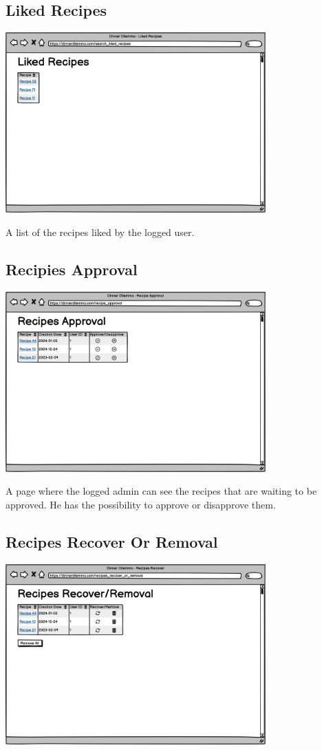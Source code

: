 \subsection{Liked Recipes}
\includegraphics[width=0.75\textwidth]{images/likedrecipes.png}

A list of the recipes liked by the logged user.

\subsection{Recipies Approval}
\includegraphics[width=0.75\textwidth]{images/recipesapproval.png}

A page where the logged admin can see the recipes that are waiting to be approved. He has the possibility to approve or disapprove them.


\subsection{Recipes Recover Or Removal}
\includegraphics[width=0.75\textwidth]{images/recipesrecoverorremoval.png}

